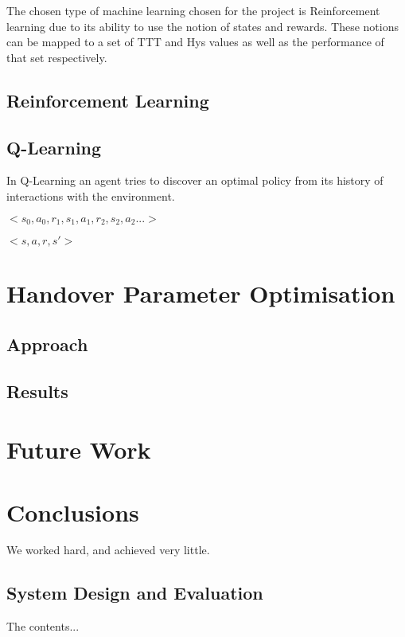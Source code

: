 \documentclass[12pt, oneside]{report}
\begin{document}
The chosen type of machine learning chosen for the project is Reinforcement learning due to its ability to use the notion of states and rewards. These notions can be mapped to a set of TTT and Hys values as well as the performance of that set respectively.

\section{Reinforcement Learning}\label{reinforcement learning}
\section{Q-Learning}\label{qlearning}
In Q-Learning an agent tries to discover an optimal policy from its history of interactions with the environment.
\begin{center}
$<s_{0},a_{0},r_{1},s_{1},a_{1},r_{2},s_{2},a_{2}...>$
\end{center}

\begin{center}
$<s,a,r,s'>$
\end{center}

\chapter{Handover Parameter Optimisation}\label{handover parameter optimisation}
\section{Approach}\label{approach}
\section{Results}\label{results}

\chapter{Future Work}\label{future work}

\chapter{Conclusions}\label{conclusion}
We worked hard, and achieved very little.

\pagebreak




\begin{appendices}
\chapter{System Design and Evaluation}
The contents...

%

\end{appendices}
\end{document}
